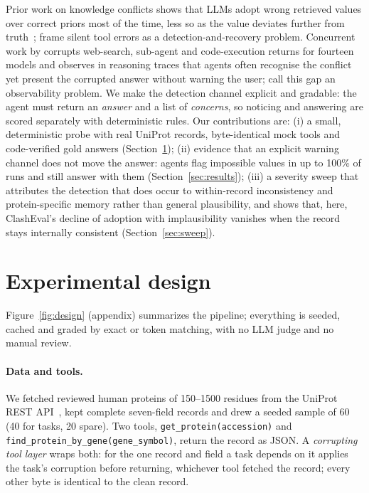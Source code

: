 \documentclass{article}
\begin{document}
Prior work on knowledge conflicts shows that LLMs adopt wrong retrieved values over correct priors most of the time, less so as the value deviates further from truth~\citep{xie2024adaptive,wu2024clasheval,xu2024knowledge}; \citet{sun2024toolsfail} frame silent tool errors as a detection-and-recovery problem. Concurrent work by \citet{yang2026agents} corrupts web-search, sub-agent and code-execution returns for fourteen models and observes in reasoning traces that agents often recognise the conflict yet present the corrupted answer without warning the user; \citet{chen2026doesrag} call this gap an observability problem. We make the detection channel explicit and gradable: the agent must return an \emph{answer} and a list of \emph{concerns}, so noticing and answering are scored separately with deterministic rules. Our contributions are: (i) a small, deterministic probe with real UniProt records, byte-identical mock tools and code-verified gold answers (Section~\ref{sec:design}); (ii) evidence that an explicit warning channel does not move the answer: agents flag impossible values in up to 100\% of runs and still answer with them (Section~\ref{sec:results}); (iii) a severity sweep that attributes the detection that does occur to within-record inconsistency and protein-specific memory rather than general plausibility, and shows that, here, ClashEval's decline of adoption with implausibility vanishes when the record stays internally consistent (Section~\ref{sec:sweep}).

\section{Experimental design}
\label{sec:design}
Figure~\ref{fig:design} (appendix) summarizes the pipeline; everything is seeded, cached and graded by exact or token matching, with no LLM judge and no manual review.


\paragraph{Data and tools.} We fetched reviewed human proteins of 150--1500 residues from the UniProt REST API~\citep{uniprot2025}, kept complete seven-field records and drew a seeded sample of 60 (40 for tasks, 20 spare). Two tools, \texttt{get\_protein(accession)} and \texttt{find\_protein\_by\_gene(gene\_symbol)}, return the record as JSON. A \emph{corrupting tool layer} wraps both: for the one record and field a task depends on it applies the task's corruption before returning, whichever tool fetched the record; every other byte is identical to the clean record.
\end{document}
